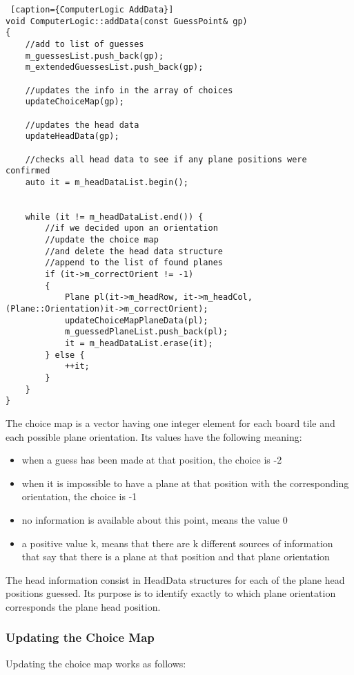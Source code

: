 \begin{lstlisting} [caption={ComputerLogic AddData}]
void ComputerLogic::addData(const GuessPoint& gp)
{
	//add to list of guesses
	m_guessesList.push_back(gp);
	m_extendedGuessesList.push_back(gp);
	
	//updates the info in the array of choices
	updateChoiceMap(gp);
	
	//updates the head data
	updateHeadData(gp);
	
	//checks all head data to see if any plane positions were confirmed
	auto it = m_headDataList.begin();
	
	
	while (it != m_headDataList.end()) {
		//if we decided upon an orientation
		//update the choice map
		//and delete the head data structure
		//append to the list of found planes
		if (it->m_correctOrient != -1)
		{
			Plane pl(it->m_headRow, it->m_headCol, (Plane::Orientation)it->m_correctOrient);
			updateChoiceMapPlaneData(pl);
			m_guessedPlaneList.push_back(pl);
			it = m_headDataList.erase(it);
		} else {
			++it;
		}
	}
}
\end{lstlisting}

The choice map is a vector having one integer element for each board tile and each possible plane orientation. Its values have the following meaning:

\begin{itemize}
	\item when a guess has been made at that position, the choice is -2
	\item when it is impossible to have a plane at that position with the corresponding orientation, the choice is -1
	\item no information is available about this point, means the value 0
	\item a positive value k, means that there are k different sources of information that say that there is a plane at that position and that plane orientation
\end{itemize}

The head information consist in HeadData structures for each of the plane head positions guessed. Its purpose is to identify exactly to which plane orientation corresponds the plane head position.

\subsubsection{Updating the Choice Map}

Updating the choice map works as follows:

